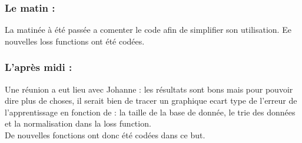 \subsubsection*{Le matin :}
La matinée à été passée a comenter le code afin de simplifier son utilisation.
Ee nouvelles loss functions ont été codées.


\subsubsection*{L'après midi :}

Une réunion a eut lieu avec Johanne :
les résultats sont bons mais pour pouvoir dire plus de choses, il serait bien de tracer un graphique ecart type de l'erreur de l'apprentissage en fonction de : la taille de la base de donnée, le trie des données et la normalisation dans la loss function.\\
De nouvelles fonctions ont donc été codées dans ce but.

